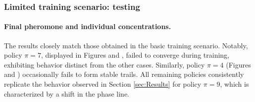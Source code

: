 \subsubsection{Limited training scenario: testing}
\label{sec:additional_res_spec}

\paragraph{Final pheromone and individual concentrations.}
The results closely match those obtained in the basic training scenario. Notably, policy $\pi=7$, displayed in Figures  and , failed to converge during training, exhibiting behavior distinct from the other cases. Similarly, policy $\pi=4$ (Figures  and ) occasionally fails to form stable trails. All remaining policies consistently replicate the behavior observed in Section \ref{sec:Results} for policy $\pi=9$, which is characterized by a shift in the phase line.

